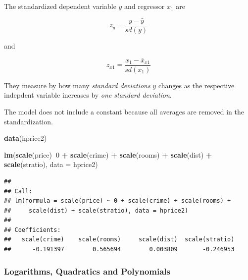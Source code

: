 \documentclass[]{book}
\newenvironment{Shaded}{\begin{snugshade}}{\end{snugshade}}
\newcommand{\DataTypeTok}[1]{\textcolor[rgb]{0.13,0.29,0.53}{#1}}
\newcommand{\DecValTok}[1]{\textcolor[rgb]{0.00,0.00,0.81}{#1}}
\newcommand{\KeywordTok}[1]{\textcolor[rgb]{0.13,0.29,0.53}{\textbf{#1}}}
\newcommand{\NormalTok}[1]{#1}
\newcommand{\OperatorTok}[1]{\textcolor[rgb]{0.81,0.36,0.00}{\textbf{#1}}}
\newcommand{\StringTok}[1]{\textcolor[rgb]{0.31,0.60,0.02}{#1}}
\begin{document}
The standardized dependent variable \(y\) and regressor \(x_1\) are

\begin{equation}
z_y=\frac{y-\bar{y}}{sd(y)}
\end{equation}

and

\begin{equation}
z_{x1}=\frac{x_{1}-\bar{x}_{x1}}{sd(x_{1})}
\end{equation}

They measure by how many \emph{standard deviations} \(y\) changes as the
respective indepdent variable increases by \emph{one standard
deviation}.

The model does not include a constant because all averages are removed
in the standardization.

\begin{Shaded}
\begin{Highlighting}[]
\KeywordTok{data}\NormalTok{(hprice2)}
\end{Highlighting}
\end{Shaded}

\begin{Shaded}
\begin{Highlighting}[]
\KeywordTok{lm}\NormalTok{(}\KeywordTok{scale}\NormalTok{(price)}\OperatorTok{~}\DecValTok{0} \OperatorTok{+}\StringTok{  }\KeywordTok{scale}\NormalTok{(crime) }\OperatorTok{+}\StringTok{  }\KeywordTok{scale}\NormalTok{(rooms) }\OperatorTok{+}\StringTok{ }\KeywordTok{scale}\NormalTok{(dist) }\OperatorTok{+}\StringTok{  }\KeywordTok{scale}\NormalTok{(stratio), }\DataTypeTok{data =}\NormalTok{ hprice2)}
\end{Highlighting}
\end{Shaded}

\begin{verbatim}
## 
## Call:
## lm(formula = scale(price) ~ 0 + scale(crime) + scale(rooms) + 
##     scale(dist) + scale(stratio), data = hprice2)
## 
## Coefficients:
##   scale(crime)    scale(rooms)     scale(dist)  scale(stratio)  
##      -0.191397        0.565694        0.003809       -0.246953
\end{verbatim}

\hypertarget{logarithms-quadratics-and-polynomials}{%
\subsubsection{Logarithms, Quadratics and
Polynomials}\label{logarithms-quadratics-and-polynomials}}
\end{document}
